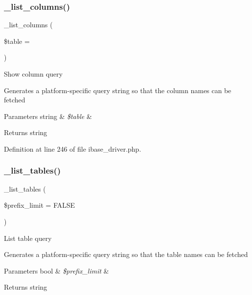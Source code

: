 \subsubsection{\texorpdfstring{\_list\_columns()}{\_list\_columns()}}
{\footnotesize\ttfamily \+\_\+list\+\_\+columns (\begin{DoxyParamCaption}\item[{}]{\$table = {\ttfamily \textquotesingle{}\textquotesingle{}} }\end{DoxyParamCaption})\hspace{0.3cm}{\ttfamily [protected]}}

Show column query

Generates a platform-\/specific query string so that the column names can be fetched


\begin{DoxyParams}[1]{Parameters}
string & {\em \$table} & \\
\hline
\end{DoxyParams}
\begin{DoxyReturn}{Returns}
string 
\end{DoxyReturn}


Definition at line 246 of file ibase\+\_\+driver.\+php.

\mbox{\label{class_c_i___d_b__ibase__driver_a435c0f3ce54fe7daa178baa8532ebd54}} 
\subsubsection{\texorpdfstring{\_list\_tables()}{\_list\_tables()}}
{\footnotesize\ttfamily \+\_\+list\+\_\+tables (\begin{DoxyParamCaption}\item[{}]{\$prefix\+\_\+limit = {\ttfamily FALSE} }\end{DoxyParamCaption})\hspace{0.3cm}{\ttfamily [protected]}}

List table query

Generates a platform-\/specific query string so that the table names can be fetched


\begin{DoxyParams}[1]{Parameters}
bool & {\em \$prefix\+\_\+limit} & \\
\hline
\end{DoxyParams}
\begin{DoxyReturn}{Returns}
string 
\end{DoxyReturn}


